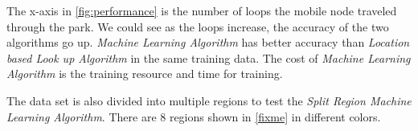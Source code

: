 The x-axis in \ref{fig:performance} is the number of loops the mobile node traveled through the park. We could see as the loops increase, the accuracy of the two algorithms go up. 
\emph{Machine Learning Algorithm} has better accuracy than \emph{Location based Look up Algorithm} in the same training data. The cost of \emph{Machine Learning Algorithm} is the training resource and time for training.

The data set is also divided into multiple regions to test the \emph{Split Region Machine Learning Algorithm}. There are 8 regions shown in \ref{fixme}
in different colors.







